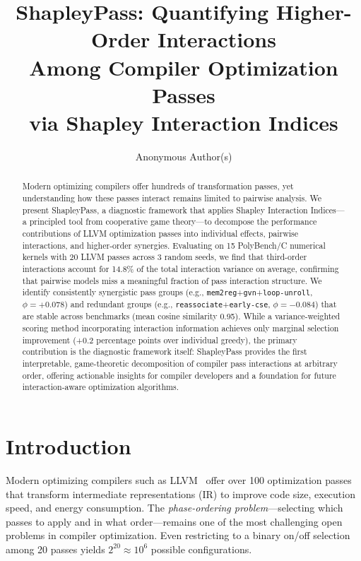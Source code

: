 \documentclass[preprint]{article}
\title{ShapleyPass: Quantifying Higher-Order Interactions\\ Among Compiler Optimization Passes\\ via Shapley Interaction Indices}
\author{
  Anonymous Author(s)
}
\newcommand{\shapval}{\phi}
\begin{document}
\maketitle

\begin{abstract}
Modern optimizing compilers offer hundreds of transformation passes, yet understanding how these passes interact remains limited to pairwise analysis. We present ShapleyPass, a diagnostic framework that applies Shapley Interaction Indices---a principled tool from cooperative game theory---to decompose the performance contributions of LLVM optimization passes into individual effects, pairwise interactions, and higher-order synergies. Evaluating on 15 PolyBench/C numerical kernels with 20 LLVM passes across 3 random seeds, we find that third-order interactions account for 14.8\% of the total interaction variance on average, confirming that pairwise models miss a meaningful fraction of pass interaction structure. We identify consistently synergistic pass groups (e.g., \texttt{mem2reg}+\texttt{gvn}+\texttt{loop-unroll}, $\shapval{=}+0.078$) and redundant groups (e.g., \texttt{reassociate}+\texttt{early-cse}, $\shapval{=}-0.084$) that are stable across benchmarks (mean cosine similarity 0.95). While a variance-weighted scoring method incorporating interaction information achieves only marginal selection improvement (+0.2 percentage points over individual greedy), the primary contribution is the diagnostic framework itself: ShapleyPass provides the first interpretable, game-theoretic decomposition of compiler pass interactions at arbitrary order, offering actionable insights for compiler developers and a foundation for future interaction-aware optimization algorithms.
\end{abstract}

\section{Introduction}

Modern optimizing compilers such as LLVM~\citep{lattner2004llvm} offer over 100 optimization passes that transform intermediate representations (IR) to improve code size, execution speed, and energy consumption. The \emph{phase-ordering problem}---selecting which passes to apply and in what order---remains one of the most challenging open problems in compiler optimization. Even restricting to a binary on/off selection among 20 passes yields $2^{20} \approx 10^6$ possible configurations.
\end{document}

